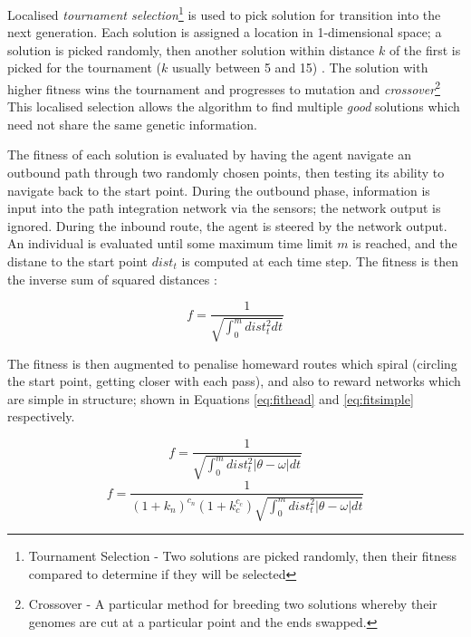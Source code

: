 \documentclass[a4paper,11pt,twoside,openright]{article}
\begin{document}
Localised \textit{tournament selection}\footnote{Tournament Selection - Two
  solutions are picked randomly, then their fitness compared to determine if they
  will be selected} is used to pick solution for transition into the next
generation. Each solution is assigned a location in 1-dimensional space; a
solution is picked randomly, then another solution within distance $k$ of the
first is picked for the tournament ($k$ usually between 5 and 15)
\cite{Haferlach2007}. The solution with higher fitness wins the tournament
and progresses to mutation and \textit{crossover}\footnote{Crossover - A
  particular method for breeding two solutions whereby their genomes are cut at
  a particular point and the ends swapped.} This localised selection allows
the algorithm to find multiple \textit{good} solutions which need not share the
same genetic information.
\newline
\par

The fitness of each solution is evaluated by having the agent navigate an
outbound path through two randomly chosen points, then testing its ability
to navigate back to the start point. During the outbound phase, information is
input into the path integration network via the sensors; the network output is
ignored. During the inbound route, the agent is steered by the network output.
An individual is evaluated until some maximum time limit $m$ is reached, and the
distane to the start point $dist_t$ is computed at each time step. The fitness is
then the inverse sum of squared distances \cite{Haferlach2007}:

\begin{equation}
 f = \frac{1}{\sqrt{\int_{0}^m dist_t^2 dt}}
\end{equation}

The fitness is then augmented to penalise homeward routes which
spiral (circling the start point, getting closer with each pass), and
also to reward networks which are simple in structure; shown in
Equations \ref{eq:fithead} and \ref{eq:fitsimple} respectively.

\begin{multicols}{2}
  \begin{equation}
    \label{eq:fithead}
   f = \frac{1}{\sqrt{\int_{0}^m dist_t^2 |\theta - \omega | dt}}
  \end{equation}\break
  \begin{equation}
    \label{eq:fitsimple}
    f = \frac{1}{(1 + k_n)^{c_n}(1 + k_c^{c_c})
      \sqrt{\int_{0}^m dist_t^2 |\theta - \omega | dt}}
  \end{equation}
\end{multicols}
\end{document}
